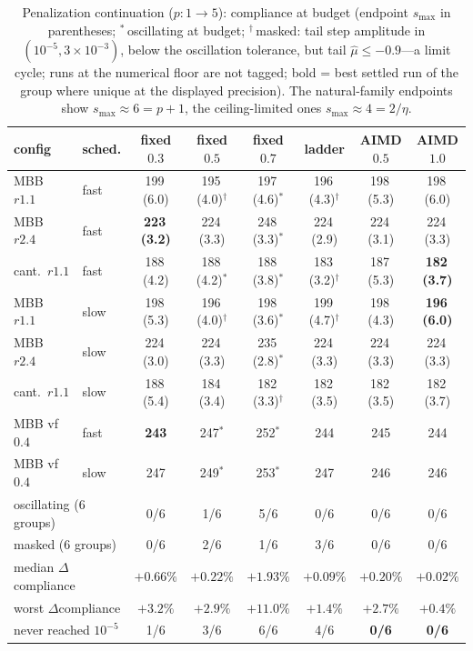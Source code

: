 \documentclass[11pt,a4paper]{article}
\newcommand{\smax}{s_{\max}}
\newcommand{\muh}{\hat{\mu}}
\begin{document}
\begin{table}[t]
\centering\small
\caption{Penalization continuation ($p:1\to5$): compliance at budget
(endpoint $\smax$ in parentheses; $^{\ast}$\,oscillating at budget;
$^{\dagger}$\,masked: tail step amplitude in $(10^{-5},3\times10^{-3})$,
below the oscillation tolerance, but tail $\muh\le-0.9$---a limit cycle;
runs at the numerical floor are not tagged; bold = best settled run of
the group where unique at the displayed precision). The natural-family endpoints show
$\smax\approx6=p{+}1$, the ceiling-limited ones
$\smax\approx4=2/\eta$.}
\label{tab:cont}
\begin{tabular}{llcccccc}
\toprule
config & sched. & fixed $0.3$ & fixed $0.5$ & fixed $0.7$ & ladder &
AIMD $0.5$ & AIMD $1.0$ \\
\midrule
MBB $r1.1$ & fast & 199\,(6.0) & 195\,(4.0)$^{\dagger}$ &
  197\,(4.6)$^{\ast}$ & 196\,(4.3)$^{\dagger}$ & 198\,(5.3) &
  198\,(6.0) \\
MBB $r2.4$ & fast & \textbf{223\,(3.2)} & 224\,(3.3) &
  248\,(3.3)$^{\ast}$ & 224\,(2.9) & 224\,(3.1) & 224\,(3.3) \\
cant.\ $r1.1$ & fast & 188\,(4.2) & 188\,(4.2)$^{\ast}$ &
  188\,(3.8)$^{\ast}$ & 183\,(3.2)$^{\dagger}$ & 187\,(5.3) &
  \textbf{182\,(3.7)} \\
MBB $r1.1$ & slow & 198\,(5.3) & 196\,(4.0)$^{\dagger}$ &
  198\,(3.6)$^{\ast}$ & 199\,(4.7)$^{\dagger}$ & 198\,(4.3) &
  \textbf{196\,(6.0)} \\
MBB $r2.4$ & slow & 224\,(3.0) & 224\,(3.3) & 235\,(2.8)$^{\ast}$ &
  224\,(3.3) & 224\,(3.3) & 224\,(3.3) \\
cant.\ $r1.1$ & slow & 188\,(5.4) & 184\,(3.4) & 182\,(3.3)$^{\dagger}$ &
  182\,(3.5) & 182\,(3.5) & 182\,(3.7) \\
MBB vf$0.4$ & fast & \textbf{243} & 247$^{\ast}$ & 252$^{\ast}$ &
  244 & 245 & 244 \\
MBB vf$0.4$ & slow & 247 & 249$^{\ast}$ & 253$^{\ast}$ &
  247 & 246 & 246 \\
\midrule
\multicolumn{2}{l}{oscillating (6 groups)} & 0/6 & 1/6 & 5/6 & 0/6 &
  0/6 & 0/6 \\
\multicolumn{2}{l}{masked (6 groups)} & 0/6 & 2/6 & 1/6 & 3/6 &
  0/6 & 0/6 \\
\multicolumn{2}{l}{median $\Delta$compliance} & $+0.66\%$ & $+0.22\%$ &
  $+1.93\%$ & $+0.09\%$ & $+0.20\%$ & $\mathbf{+0.02\%}$ \\
\multicolumn{2}{l}{worst $\Delta$compliance} & $+3.2\%$ & $+2.9\%$ &
  $+11.0\%$ & $+1.4\%$ & $+2.7\%$ & $\mathbf{+0.4\%}$ \\
\multicolumn{2}{l}{never reached $10^{-5}$} & 1/6 & 3/6 & 6/6 & 4/6 &
  \textbf{0/6} & \textbf{0/6} \\
\bottomrule
\end{tabular}


\end{table}
\end{document}
